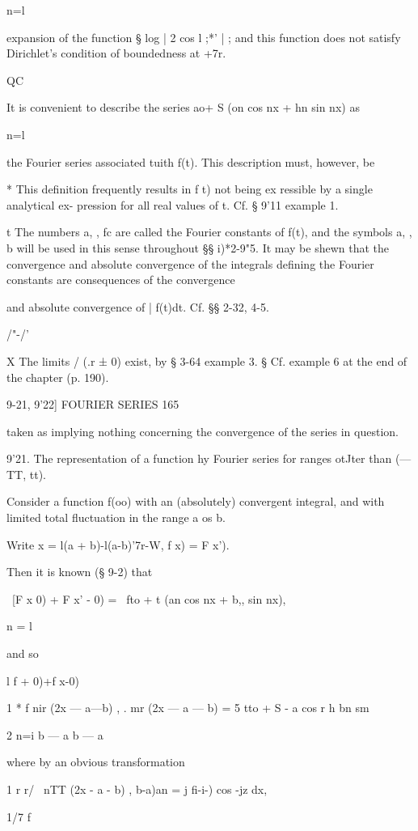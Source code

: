 n=l

expansion of the function § log | 2 cos l ;*' | ; and this function
does not satisfy Dirichlet's condition of boundedness at +7r.

QC

It is convenient to describe the series ao+ S (on cos nx + hn sin nx)
as

n=l

the Fourier series associated tuith f(t). This description must,
however, be

* This definition frequently results in f t) not being ex ressible by
a single analytical ex- pression for all real values of t. Cf. § 9'11
example 1.

t The numbers a, , fc are called the Fourier constants of f(t), and
the symbols a, , b will be used in this sense throughout §§ i)*2-9"5.
It may be shewn that the convergence and absolute convergence of the
integrals defining the Fourier constants are consequences of the
convergence

and absolute convergence of | f(t)dt. Cf. §§ 2-32, 4-5.

/"-/'

X The limits / (.r ± 0) exist, by § 3-64 example 3. § Cf. example 6 at
the end of the chapter (p. 190).

9-21, 9'22] FOURIER SERIES 165

taken as implying nothing concerning the convergence of the series in
question.

9'21. The representation of a function hy Fourier series for ranges
otJter than (— TT, tt).

Consider a function f(oo) with an (absolutely) convergent integral,
and with limited total fluctuation in the range a os b.

Write x = l(a + b)-l(a-b)'7r-W, f x) = F x').

Then it is known (§ 9-2) that

\ [F x 0) + F x' - 0) = \ fto + t (an cos nx + b,, sin nx),

n = l

and so

l f + 0)+f x-0)

1 * f nir (2x — a—b) , . mr (2x — a — b) = 5 tto + S - a cos r h bn sm

2 n=i b — a b — a

where by an obvious transformation

1 r r/ \ nTT (2x - a - b) , b-a)an = j fi-i-) cos -jz dx,

1/7 \; f%

